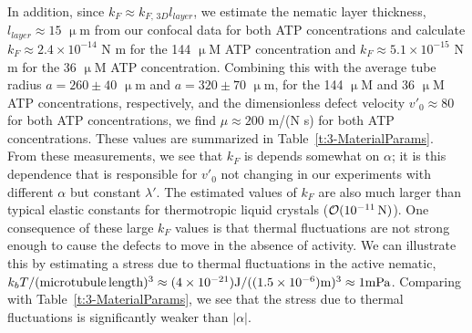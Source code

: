 In addition, since $k_F \approx k_{F,\,3D}l_{layer}$, we estimate the nematic layer thickness, $l_{layer} \approx 15$ $\upmu$m from our confocal data for both ATP concentrations and calculate $k_F \approx 2.4 \times 10^{-14}$ N m for the 144 $\upmu$M ATP concentration and $k_F \approx 5.1 \times 10^{-15}$ N m for the 36 $\upmu$M ATP concentration.
Combining this with the average tube radius $a = 260 \pm 40$ $\upmu$m and $a = 320 \pm 70$ $\upmu$m, for the 144 $\upmu$M and 36 $\upmu$M ATP concentrations, respectively, and the dimensionless defect velocity $v'_0 \approx 80$ for both ATP concentrations, we find $\mu \approx 200$ m/(N s) for both ATP concentrations.
These values are summarized in Table~\ref{t:3-MaterialParams}.
From these measurements, we see that $k_F$ is depends somewhat on $\alpha$; it is this dependence that is responsible for $v'_0$ not changing in our experiments with different $\alpha$ but constant $\lambda'$.
The estimated values of $k_F$ are also much larger than typical elastic constants for thermotropic liquid crystals ($\mathcal{O}(10^{-11}\, {\rm N})$).
One consequence of these large $k_F$ values is that thermal fluctuations are not strong enough to cause the defects to move in the absence of activity.
We can illustrate this by estimating a stress due to thermal fluctuations in the active nematic, $k_b T/({\rm microtubule\, length})^3 \approx (4 \times 10^{-21} ){\rm J}/((1.5 \times 10^{-6}) {\rm m})^3 \approx 1 {\rm mPa}$.
Comparing with Table~\ref{t:3-MaterialParams}, we see that the stress due to thermal fluctuations is significantly weaker than $|\alpha|$.

